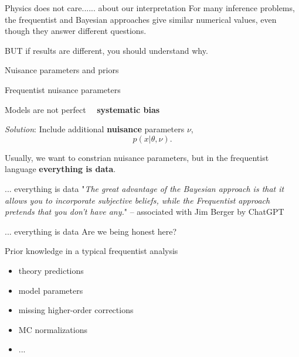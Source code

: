\documentclass[
aspectratio=169,
14pt,
professionalfonts
]{beamer}
\newcommand{\arrow}{~\ding{220}~}
\begin{document}
\begin{frame}{Physics does not care...}{... about our interpretation}
For many inference problems, the frequentist and Bayesian approaches give similar numerical values, even though they answer different questions.

\vspace{0.5cm}

BUT if results are different, you should understand why.
\end{frame}

\begin{frame}
\center
\Large
Nuisance parameters and priors
\end{frame}

\begin{frame}{Frequentist nuisance parameters}

Models are not perfect \arrow \textbf{systematic bias}

\textit{Solution}: Include additional \textbf{nuisance} parameters $\nu$,
$$p(x|\theta, \nu).$$

Usually, we want to constrian nuisance parameters, but in the frequentist language \textbf{everything is data}.

\end{frame}

\begin{frame}{... everything is data}
    "\textit{The great advantage of the Bayesian approach is that it allows you to incorporate subjective beliefs, while the Frequentist approach pretends that you don't have any.}"
    \flushright -- associated with Jim Berger by ChatGPT
\end{frame}

\begin{frame}{... everything is data}
    {\centering Are we being honest here?}

    Prior knowledge in a typical frequentist analysis
    \begin{itemize}
        \item theory predictions
        \item model parameters
        \item missing higher-order corrections
        \item MC normalizations
        \item ...
    \end{itemize}
\end{frame}
\end{document}
